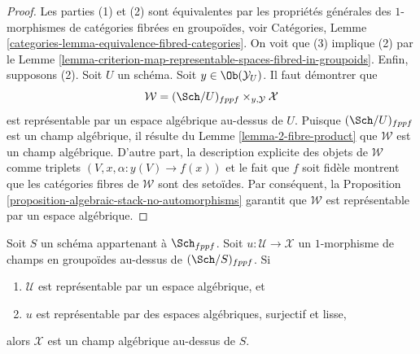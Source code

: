 \begin{proof}
Les parties (1) et (2) sont équivalentes par les propriétés générales des $1$-morphismes
de catégories fibrées en groupoïdes, voir
Catégories, Lemme \ref{categories-lemma-equivalence-fibred-categories}.
On voit que (3) implique (2) par le
Lemme \ref{lemma-criterion-map-representable-spaces-fibred-in-groupoids}.
Enfin, supposons (2).
Soit $U$ un schéma. Soit $y \in \Ob(\mathcal{Y}_U)$.
Il faut démontrer que
$$
\mathcal{W} = (\Sch/U)_{fppf} \times_{y, \mathcal{Y}} \mathcal{X}
$$
est représentable par un espace algébrique au-dessus de $U$. Puisque
$(\Sch/U)_{fppf}$ est un champ algébrique, il résulte du
Lemme \ref{lemma-2-fibre-product}
que $\mathcal{W}$ est un champ algébrique.
D'autre part, la description explicite des objets de $\mathcal{W}$
comme triplets $(V, x, \alpha : y(V) \to f(x))$ et le fait que $f$ soit
fidèle montrent que les catégories fibres de $\mathcal{W}$ sont des setoïdes. Par conséquent, la
Proposition \ref{proposition-algebraic-stack-no-automorphisms}
garantit que $\mathcal{W}$ est représentable par un espace algébrique.
\end{proof}

\begin{lemma}
\label{lemma-smooth-surjective-morphism-implies-algebraic}
Soit $S$ un schéma appartenant à $\Sch_{fppf}$.
Soit $u : \mathcal{U} \to \mathcal{X}$ un $1$-morphisme de
champs en groupoïdes au-dessus de $(\Sch/S)_{fppf}$. Si
\begin{enumerate}
\item $\mathcal{U}$ est représentable par un espace algébrique, et
\item $u$ est représentable par des espaces algébriques, surjectif et lisse,
\end{enumerate}
alors $\mathcal X$ est un champ algébrique au-dessus de $S$.
\end{lemma}

